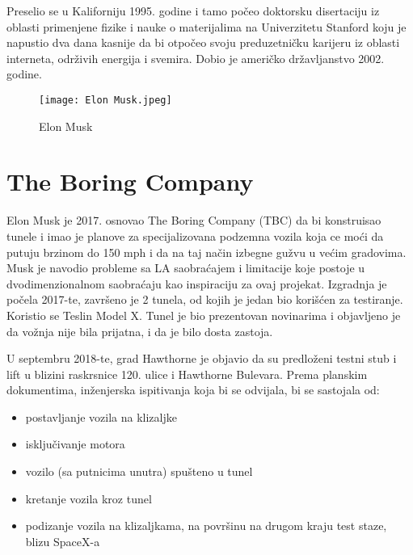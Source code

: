 \documentclass[a4paper,11pt]{article}
\begin{document}
Preselio se u Kaliforniju 1995. godine i tamo počeo doktorsku disertaciju iz oblasti primenjene fizike i nauke o materijalima na Univerzitetu Stanford koju je napustio dva dana kasnije da bi otpočeo svoju preduzetničku karijeru iz oblasti interneta, održivih energija i svemira. Dobio je američko državljanstvo 2002. godine.



\begin{figure}[h!]
\begin{center}
\texttt{[image: Elon Musk.jpeg]}
\end{center}
\caption{Elon Musk}
\label{fig:Elon Musk.jpeg}
\end{figure}

\maketitle

\section{The Boring Company}
\label{The Boring Company}

Elon Musk je 2017. osnovao The Boring Company (TBC) da bi konstruisao tunele i imao je planove za specijalizovana podzemna vozila koja ce moći da putuju brzinom do 150 mph i da na taj način izbegne gužvu u većim gradovima. Musk je navodio probleme sa LA saobraćajem i limitacije koje postoje u dvodimenzionalnom saobraćaju kao inspiraciju za ovaj projekat. Izgradnja je počela 2017-te, završeno je 2 tunela, od kojih je jedan bio korišćen za testiranje. Koristio se Teslin Model X. Tunel je bio prezentovan novinarima i objavljeno je da vožnja nije bila prijatna, i da je bilo dosta zastoja. 

U septembru 2018-te, grad Hawthorne je objavio da su predloženi testni stub i lift u blizini raskrsnice 120. ulice i Hawthorne Bulevara.  Prema planskim dokumentima,  inženjerska ispitivanja koja bi se odvijala, bi se sastojala od:

\begin{itemize}
\item postavljanje vozila na klizaljke
\item isključivanje motora
\item vozilo (sa putnicima unutra) spušteno u tunel
\item kretanje vozila kroz tunel
\item podizanje vozila na klizaljkama, na površinu na drugom kraju test staze, blizu SpaceX-a
\end{itemize} 
\end{document}
